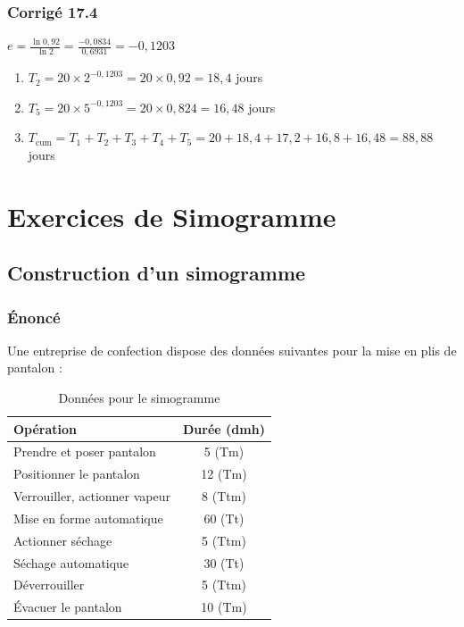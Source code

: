 \documentclass[a4paper,12pt]{article}
\begin{document}
\subsubsection*{Corrigé 17.4}

$e = \frac{\ln 0,92}{\ln 2} = \frac{-0,0834}{0,6931} = -0,1203$

\begin{enumerate}
    \item $T_2 = 20 \times 2^{-0,1203} = 20 \times 0,92 = 18,4$ jours
    \item $T_5 = 20 \times 5^{-0,1203} = 20 \times 0,824 = 16,48$ jours
    \item $T_{\text{cum}} = T_1 + T_2 + T_3 + T_4 + T_5 = 20 + 18,4 + 17,2 + 16,8 + 16,48 = 88,88$ jours
\end{enumerate}

\section{Exercices de Simogramme}

\subsection{Construction d'un simogramme}

\subsubsection*{Énoncé}

Une entreprise de confection dispose des données suivantes pour la mise en plis de pantalon :

\begin{table}[ht]
\centering
\begin{tabular}{|l|c|}
\hline
\textbf{Opération} & \textbf{Durée (dmh)} \\
\hline
Prendre et poser pantalon & 5 (Tm) \\
Positionner le pantalon & 12 (Tm) \\
Verrouiller, actionner vapeur & 8 (Ttm) \\
Mise en forme automatique & 60 (Tt) \\
Actionner séchage & 5 (Ttm) \\
Séchage automatique & 30 (Tt) \\
Déverrouiller & 5 (Ttm) \\
Évacuer le pantalon & 10 (Tm) \\
\hline
\end{tabular}
\caption{Données pour le simogramme}
\end{table}
\end{document}
